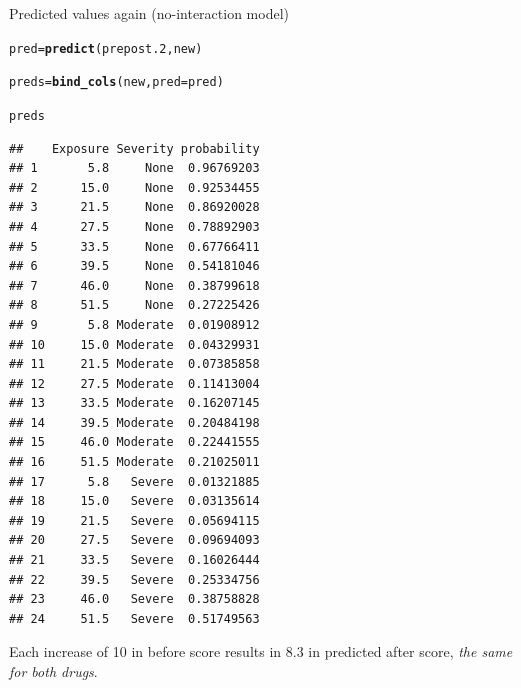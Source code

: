 \documentclass[unknownkeysallowed]{beamer}\usepackage[]{graphicx}\usepackage[]{color}
\makeatletter
\newcommand{\hlstd}[1]{\textcolor[rgb]{0.345,0.345,0.345}{#1}}%
\newcommand{\hlkwb}[1]{\textcolor[rgb]{0.69,0.353,0.396}{#1}}%
\newcommand{\hlkwc}[1]{\textcolor[rgb]{0.333,0.667,0.333}{#1}}%
\newcommand{\hlkwd}[1]{\textcolor[rgb]{0.737,0.353,0.396}{\textbf{#1}}}%
\newenvironment{kframe}{%
 \def\at@end@of@kframe{}%
 \ifinner\ifhmode%
  \def\at@end@of@kframe{\end{minipage}}%
  \begin{minipage}{\columnwidth}%
 \fi\fi%
 \def\FrameCommand##1{\hskip\@totalleftmargin \hskip-\fboxsep
 \colorbox{shadecolor}{##1}\hskip-\fboxsep
     \hskip-\linewidth \hskip-\@totalleftmargin \hskip\columnwidth}%
 \MakeFramed {\advance\hsize-\width
   \@totalleftmargin\z@ \linewidth\hsize
   \@setminipage}}%
 {\par\unskip\endMakeFramed%
 \at@end@of@kframe}
\newenvironment{knitrout}{}{} %
\makeatother
\begin{document}
\begin{frame}[fragile]{Predicted values again (no-interaction model)}

   
\begin{knitrout}
\color{fgcolor}\begin{kframe}
\begin{alltt}
\hlstd{pred}\hlkwb{=}\hlkwd{predict}\hlstd{(prepost.2,new)}
\end{alltt}


{\ttfamily\noindent\bfseries\color{errorcolor}{\#\# Error in predict(prepost.2, new): object 'prepost.2' not found}}\begin{alltt}
\hlstd{preds}\hlkwb{=}\hlkwd{bind_cols}\hlstd{(new,}\hlkwc{pred}\hlstd{=pred)}
\end{alltt}


{\ttfamily\noindent\bfseries\color{errorcolor}{\#\# Error in dots\_values(...): object 'pred' not found}}\begin{alltt}
\hlstd{preds}
\end{alltt}
\begin{verbatim}
##    Exposure Severity probability
## 1       5.8     None  0.96769203
## 2      15.0     None  0.92534455
## 3      21.5     None  0.86920028
## 4      27.5     None  0.78892903
## 5      33.5     None  0.67766411
## 6      39.5     None  0.54181046
## 7      46.0     None  0.38799618
## 8      51.5     None  0.27225426
## 9       5.8 Moderate  0.01908912
## 10     15.0 Moderate  0.04329931
## 11     21.5 Moderate  0.07385858
## 12     27.5 Moderate  0.11413004
## 13     33.5 Moderate  0.16207145
## 14     39.5 Moderate  0.20484198
## 15     46.0 Moderate  0.22441555
## 16     51.5 Moderate  0.21025011
## 17      5.8   Severe  0.01321885
## 18     15.0   Severe  0.03135614
## 19     21.5   Severe  0.05694115
## 20     27.5   Severe  0.09694093
## 21     33.5   Severe  0.16026444
## 22     39.5   Severe  0.25334756
## 23     46.0   Severe  0.38758828
## 24     51.5   Severe  0.51749563
\end{verbatim}
\end{kframe}
\end{knitrout}
 

Each increase of 10 in before score results in 8.3 in predicted after
score, \emph{the same for both drugs}.
  
\end{frame}
\end{document}
